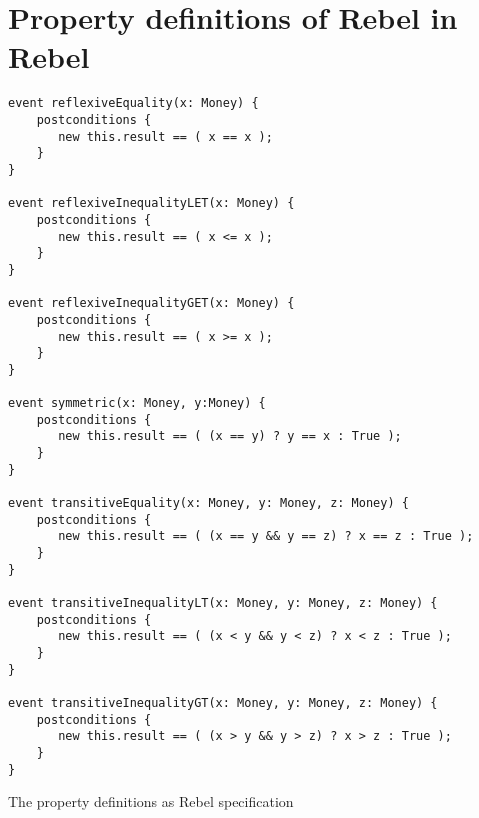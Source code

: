 %



\appendix
\chapter{Property definitions of Rebel in Rebel}
\label{app:a_event_definitions}
\FloatBarrier
\begin{sourcecode}[!ht]
\begin{lstlisting}[language=Rebel]
event reflexiveEquality(x: Money) {
    postconditions {
       new this.result == ( x == x );
    }
}

event reflexiveInequalityLET(x: Money) {
    postconditions {
       new this.result == ( x <= x );
    }
}

event reflexiveInequalityGET(x: Money) {
    postconditions {
       new this.result == ( x >= x );
    }
}

event symmetric(x: Money, y:Money) {
    postconditions {
       new this.result == ( (x == y) ? y == x : True );
    }
}

event transitiveEquality(x: Money, y: Money, z: Money) {
    postconditions {
       new this.result == ( (x == y && y == z) ? x == z : True );
    }
}

event transitiveInequalityLT(x: Money, y: Money, z: Money) {
    postconditions {
       new this.result == ( (x < y && y < z) ? x < z : True );
    }
}

event transitiveInequalityGT(x: Money, y: Money, z: Money) {
    postconditions {
       new this.result == ( (x > y && y > z) ? x > z : True );
    }
}
\end{lstlisting}
\caption{The property definitions as Rebel specification}
\end{sourcecode}
\FloatBarrier
\FloatBarrier
